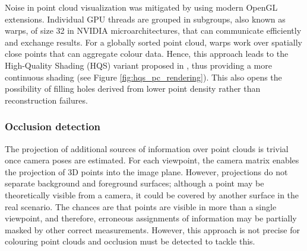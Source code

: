 Noise in point cloud visualization was mitigated by \cite{schutz_rendering_2019, schutz_rendering_2021} using modern OpenGL extensions. Individual GPU threads are grouped in subgroups, also known as warps, of size 32 in NVIDIA microarchitectures, that can communicate efficiently and exchange results. For a globally sorted point cloud, warps work over spatially close points that can aggregate colour data. Hence, this approach leads to the High-Quality Shading (HQS) variant proposed in \cite{schutz_rendering_2021}, thus providing a more continuous shading (see Figure \ref{fig:hqs_pc_rendering}). This also opens the possibility of filling holes derived from lower point density rather than reconstruction failures. 

\subsubsection{Occlusion detection}

The projection of additional sources of information over point clouds is trivial once camera poses are estimated. For each viewpoint, the camera matrix enables the projection of 3D points into the image plane. However, projections do not separate background and foreground surfaces; although a point may be theoretically visible from a camera, it could be covered by another surface in the real scenario. The chances are that points are visible in more than a single viewpoint, and therefore, erroneous assignments of information may be partially masked by other correct measurements. However, this approach is not precise for colouring point clouds and occlusion must be detected to tackle this.    

